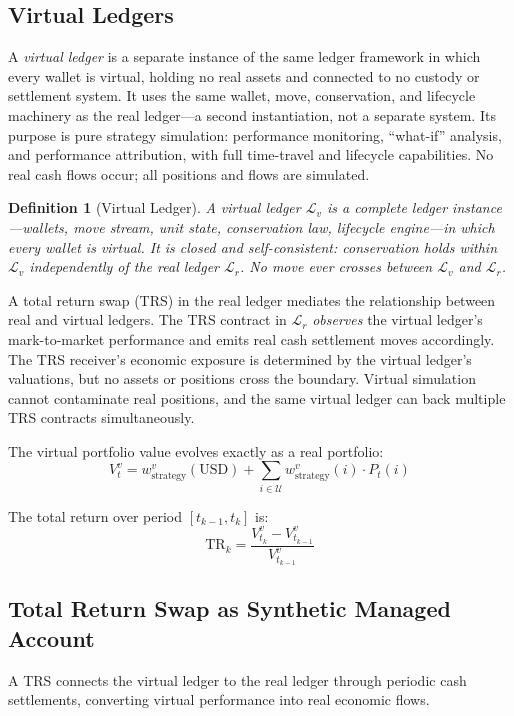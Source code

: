 \documentclass[11pt,a4paper]{article}
\newtheorem{definition}{Definition}[section]
\begin{document}
\subsection{Virtual Ledgers}
\label{sec:virtual-ledger}

A \textit{virtual ledger} is a separate instance of the same ledger framework in which every wallet is virtual, holding no real assets and connected to no custody or settlement system. It uses the same wallet, move, conservation, and lifecycle machinery as the real ledger---a second instantiation, not a separate system. Its purpose is pure strategy simulation: performance monitoring, ``what-if'' analysis, and performance attribution, with full time-travel and lifecycle capabilities. No real cash flows occur; all positions and flows are simulated.

\begin{definition}[Virtual Ledger]
A virtual ledger $\mathcal{L}_v$ is a complete ledger instance---wallets, move stream, unit state, conservation law, lifecycle engine---in which every wallet is virtual. It is closed and self-consistent: conservation holds within $\mathcal{L}_v$ independently of the real ledger $\mathcal{L}_r$. No move ever crosses between $\mathcal{L}_v$ and $\mathcal{L}_r$.
\end{definition}

A total return swap (TRS) in the real ledger mediates the relationship between real and virtual ledgers. The TRS contract in $\mathcal{L}_r$ \textit{observes} the virtual ledger's mark-to-market performance and emits real cash settlement moves accordingly. The TRS receiver's economic exposure is determined by the virtual ledger's valuations, but no assets or positions cross the boundary. Virtual simulation cannot contaminate real positions, and the same virtual ledger can back multiple TRS contracts simultaneously.

The virtual portfolio value evolves exactly as a real portfolio:
\[
V^v_t = w^v_{\text{strategy}}(\text{USD}) + \sum_{i \in \mathcal{U}} w^v_{\text{strategy}}(i) \cdot P_t(i)
\]

The total return over period $[t_{k-1}, t_k]$ is:
\[
\text{TR}_k = \frac{V^v_{t_k} - V^v_{t_{k-1}}}{V^v_{t_{k-1}}}
\]

\subsection{Total Return Swap as Synthetic Managed Account}

A TRS connects the virtual ledger to the real ledger through periodic cash settlements, converting virtual performance into real economic flows.
\end{document}
